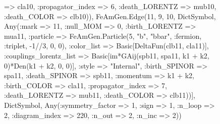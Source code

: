 \documentclass{revtex4}
\begin{document}
\begin{figure}[!htb]
\begin{center}
{=> cla10, :propagator_index => 6, :death_LORENTZ => mub10, :death_COLOR => clb10)), FeAmGen.Edge(11, 9, 10, Dict{Symbol, Any}(:mark => 11, :null_MOM => 0, :birth_LORENTZ => mua11, :particle => FeAmGen.Particle(5, "b", "bbar", :fermion, :triplet, -1//3, 0, 0), :color_list => Basic[DeltaFun(clb11, cla11)], :couplings_lorentz_list => Basic[im*GAij(spb11, spa11, k1 + k2, 0)*Den(k1 + k2, 0, 0)], :style => "Internal", :birth_SPINOR => spa11, :death_SPINOR => spb11, :momentum => k1 + k2, :birth_COLOR => cla11, :propagator_index => 7, :death_LORENTZ => mub11, :death_COLOR => clb11))], Dict{Symbol, Any}(:symmetry_factor => 1, :sign => 1, :n_loop => 2, :diagram_index => 220, :n_out => 2, :n_inc => 2)) 
}
\end{center}
\end{figure}
\end{document}
